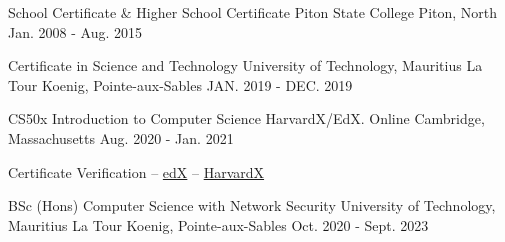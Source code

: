 
\begin{cventries}

  \cventry
    {School Certificate \& Higher School Certificate} %
    {Piton State College} %
    {Piton, North} %
    {Jan. 2008 - Aug. 2015} %
    {}


  \cventry
    {Certificate in Science and Technology} %
    {University of Technology, Mauritius} %
    {La Tour Koenig, Pointe-aux-Sables} %
    {JAN. 2019 - DEC. 2019} %
    {}

  \cventry
    {CS50x Introduction to Computer Science} %
    {HarvardX/EdX. Online} %
    {Cambridge, Massachusetts} %
    {Aug. 2020 - Jan. 2021} %
    {
      \begin{cvitems} %
        \item {Certificate Verification – \href{https://courses.edx.org/certificates/dc159688956e4b52b259d94cbf017a89}{\color{ao}edX} – \href{https://cs50.harvard.edu/certificates/95b21c04-9bea-4f53-8d53-66f828e75fd2}{\color{ao}HarvardX}}
      \end{cvitems}
    }

  \cventry
    {BSc (Hons) Computer Science with Network Security} %
    {University of Technology, Mauritius} %
    {La Tour Koenig, Pointe-aux-Sables} %
    {Oct. 2020 - Sept. 2023} %
    {}

\end{cventries}

